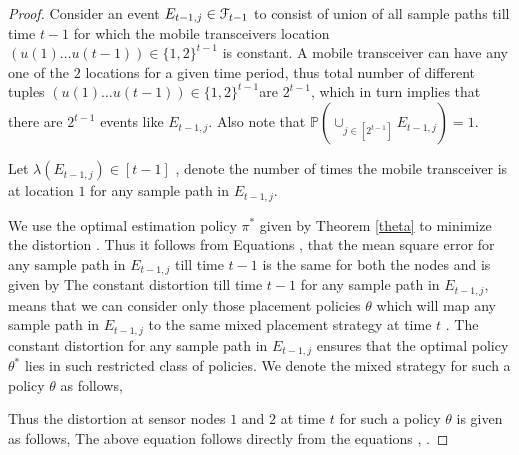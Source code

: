 \documentclass[a4paper,english,12pt]{article}
\begin{document}
\begin{proof}
Consider an event $E_{t-1,j}\in \mathcal{F}_{t-1} $ to consist of union of all sample paths till time $t-1$ for which the mobile transceivers location $(u(1)\dots u(t-1)) \in \{1,2\}^{t-1}$ is constant. A mobile transceiver can have any one of the $2$ locations for a given time period, thus total number of different tuples $(u(1)\dots u(t-1)) \in \{1,2\}^{t-1}$are $2^{t-1}$, which in turn implies that there are $2^{t-1}$ events like $E_{t-1,j}$. Also note that  $\mathbb{P}(\cup_{j \in [2^{t-1}]}E_{t-1,j})=1$.

Let $\lambda(E_{t-1,j}) \in   [t-1]$ , denote the number of times the mobile transceiver is at location $1$ for any sample path in $E_{t-1,j}$.

 We use the optimal estimation policy $\pi^*$ given by Theorem \ref{theta} to minimize the distortion . Thus it follows from Equations ,  that the mean square error for any sample path in $E_{t-1,j}$ till time $t-1$  is the same for both the nodes and is given by  The constant distortion till time $t-1$ for any sample path in $E_{t-1,j}$, means that we can consider only those placement policies $\theta$ which will map any sample path in $E_{t-1,j}$ to the same mixed placement strategy  at time $t$ . The constant distortion for any sample path in $E_{t-1,j}$ ensures that the optimal policy $\theta^*$ lies in such restricted class of policies. We denote the mixed strategy for such a policy $\theta$ as follows,
    
    Thus the distortion at sensor nodes $1$ and $2$ at time $t$ for such a policy $\theta$  is given as follows,
    The above equation follows directly from the equations  , .
    

\end{proof}
\end{document}
